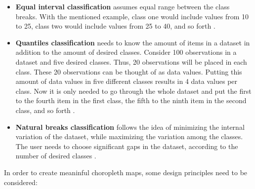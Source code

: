 \begin{itemize}

\item \textbf{Equal interval classification} assumes equal range between the class breaks. With the mentioned example, class one would include values from 10 to 25, class two would include values from 25 to 40, and so forth .

\item \textbf{Quantiles classification} needs to know the amount of items in a dataset in addition to the amount of desired classes. Consider 100 observations in a dataset and five desired classes. Thus, 20 observations will be placed in each class. These 20 observations can be thought of as data values. Putting this amount of data values in five different classes results in 4 data values per class. Now it is only needed to go through the whole dataset and put the first to the fourth item in the first class, the fifth to the ninth item in the second class, and so forth .

\item \textbf{Natural breaks classification} follows the idea of minimizing the internal variation of the dataset, while maximizing the variation among the classes. The user needs to choose significant gaps in the dataset, according to the number of desired classes .

\end{itemize}

In order to create meaninful choropleth maps, some design principles need to be considered:

